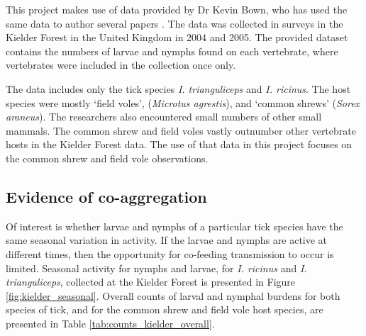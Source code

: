 \documentclass[hidelinks]{article}
\begin{document}
This project makes use of data provided by Dr Kevin Bown, who has used the same data to author several papers \citep{Bown2008, bown2009, Bown2011}. The data was collected in surveys in the Kielder Forest in the United Kingdom in 2004 and 2005. The provided dataset contains the numbers of larvae and nymphs found on each vertebrate, where vertebrates were included in the collection once only. 

The data includes only the tick species \textit{I. trianguliceps} and  \textit{I. ricinus}. The host species were mostly `field voles', (\textit{Microtus agrestis}), and `common shrews' (\textit{Sorex araneus}). The researchers also encountered small numbers of other small mammals. The common shrew and field voles vastly outnumber other vertebrate hosts in the Kielder Forest data. The use of that data in this project focuses on the common shrew and field vole observations. 

\subsection{Evidence of co-aggregation}

Of interest is whether larvae and nymphs of a particular tick species have the same seasonal variation in activity. If the larvae and nymphs are active at different times, then the opportunity for co-feeding transmission to occur is limited. Seasonal activity for nymphs and larvae, for \textit{I. ricinus} and \textit{I. trianguliceps}, collected at the Kielder Forest is presented in Figure \ref{fig:kielder_seasonal}. Overall counts of larval and nymphal burdens for both species of tick, and for the common shrew and field vole host species, are presented in Table \ref{tab:counts_kielder_overall}.
\end{document}
